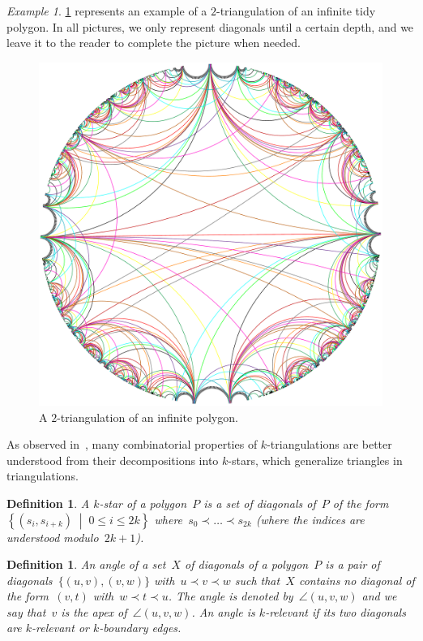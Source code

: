 \documentclass{amsart}
\newtheorem{definition}[theorem]{Definition}
\theoremstyle{remark}
\newtheorem{example}[theorem]{Example}
\newcommand{\darkblue}{\color{darkblue}} %
\newcommand{\defn}[1]{\textsl{\darkblue #1}} %
\newcommand{\set}[2]{\left\{ #1 \;\middle|\; #2 \right\}} %
\newcommand{\cl}{\prec}
\begin{document}
\begin{example}
\cref{fig:torusEdges} represents an example of a $2$-triangulation of an infinite tidy polygon.
In all pictures, we only represent diagonals until a certain depth, and we leave it to the reader to complete the picture when needed.

\begin{figure}[h]
	\capstart
	\centerline{\includegraphics[scale=.42]{torus/torusEdges}}
	\caption{A $2$-triangulation of an infinite polygon.}
	\label{fig:torusEdges}
\end{figure}
\end{example}

As observed in~\cite{PilaudSantos-multitriangulations}, many combinatorial properties of $k$-triangulations are better understood from their decompositions into $k$-stars, which generalize triangles in triangulations.

\begin{definition}
A \defn{$k$-star} of a polygon~$P$ is a set of diagonals of~$P$ of the form~$\set{(s_i, s_{i+k})}{0 \le i \le 2k}$ where~$s_0 \cl \dots \cl s_{2k}$ (where the indices are understood modulo~$2k+1$).
\end{definition}

\begin{definition}
An \defn{angle} of a set~$X$ of diagonals of a polygon~$P$ is a pair of diagonals~$\{(u,v), (v,w)\}$ with~$u \cl v \cl w$ such that~$X$ contains no diagonal of the form~$(v,t)$ with~$w \cl t \cl u$. The angle is denoted by~$\angle(u,v,w)$ and we say that~$v$ is the \defn{apex} of~$\angle(u,v,w)$. An angle is \defn{$k$-relevant} if its two diagonals are $k$-relevant or $k$-boundary edges. %
\end{definition}
\end{document}
